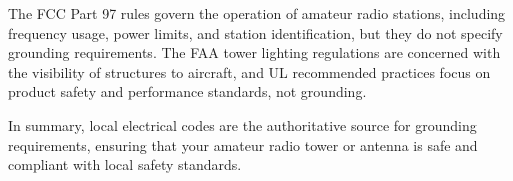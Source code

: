 The FCC Part 97 rules govern the operation of amateur radio stations, including frequency usage, power limits, and station identification, but they do not specify grounding requirements. The FAA tower lighting regulations are concerned with the visibility of structures to aircraft, and UL recommended practices focus on product safety and performance standards, not grounding.

In summary, local electrical codes are the authoritative source for grounding requirements, ensuring that your amateur radio tower or antenna is safe and compliant with local safety standards.

